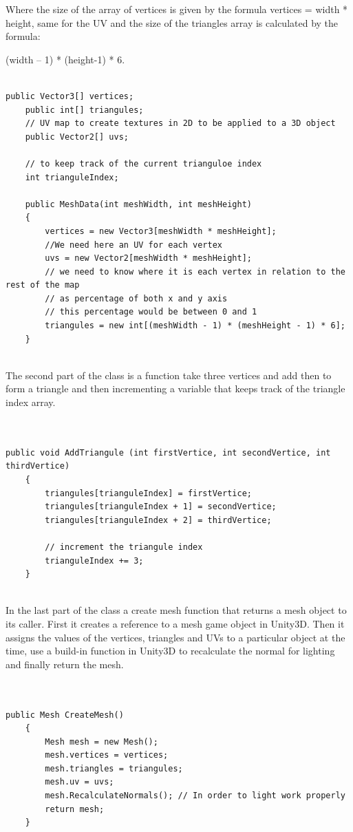 \documentclass[a4paper,12pt]{book}
\begin{document}
Where the size of the array of vertices is given by the formula vertices = width * height, same for the UV and the size of the triangles array is calculated by the formula: 

(width – 1) * (height-1) * 6.



\begin{lstlisting}

public Vector3[] vertices;
    public int[] triangules;
    // UV map to create textures in 2D to be applied to a 3D object
    public Vector2[] uvs;

    // to keep track of the current trianguloe index
    int trianguleIndex;

    public MeshData(int meshWidth, int meshHeight)
    {
        vertices = new Vector3[meshWidth * meshHeight];
        //We need here an UV for each vertex
        uvs = new Vector2[meshWidth * meshHeight];
        // we need to know where it is each vertex in relation to the rest of the map
        // as percentage of both x and y axis
        // this percentage would be between 0 and 1
        triangules = new int[(meshWidth - 1) * (meshHeight - 1) * 6];
    }


\end{lstlisting}


The second part of the class is a function take three vertices and add then to form a triangle and then incrementing a variable that keeps track of the triangle index array.


\begin{lstlisting}


public void AddTriangule (int firstVertice, int secondVertice, int thirdVertice)
    {
        triangules[trianguleIndex] = firstVertice;
        triangules[trianguleIndex + 1] = secondVertice;
        triangules[trianguleIndex + 2] = thirdVertice;

        // increment the triangule index
        trianguleIndex += 3;
    }


\end{lstlisting}

In the last part of the class a create mesh function that returns a mesh object to its caller.
First it creates a reference to a mesh game object in Unity3D. Then it assigns the values of the vertices, triangles and UVs to a particular object at the time, use a build-in function in Unity3D to recalculate the normal for lighting and finally return the mesh.


\begin{lstlisting}


public Mesh CreateMesh()
    {
        Mesh mesh = new Mesh();
        mesh.vertices = vertices;
        mesh.triangles = triangules;
        mesh.uv = uvs;
        mesh.RecalculateNormals(); // In order to light work properly
        return mesh;
    }

\end{lstlisting}
\end{document}
